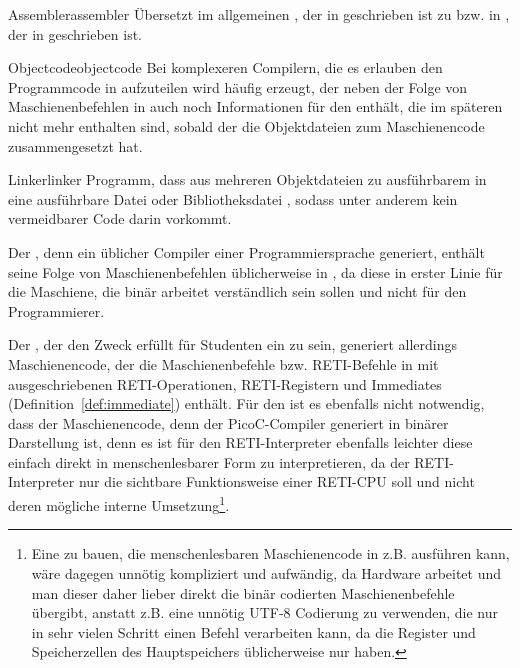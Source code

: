 \begin{Definition}{Assembler}{assembler}
  Übersetzt im allgemeinen , der in  geschrieben ist zu  bzw.  in , der in  geschrieben ist.
\end{Definition}

\begin{Definition}{Objectcode}{objectcode}
  Bei komplexeren Compilern, die es erlauben den Programmcode in  aufzuteilen wird häufig  erzeugt, der neben der Folge von Maschienenbefehlen in  auch noch Informationen für den  enthält, die im späteren  nicht mehr enthalten sind, sobald der  die Objektdateien zum Maschienencode zusammengesetzt hat.
\end{Definition}

\begin{Definition}{Linker}{linker}
  Programm, dass  aus mehreren Objektdateien zu ausführbarem  in eine ausführbare Datei oder Bibliotheksdatei , sodass unter anderem kein vermeidbarer  Code darin vorkommt.
\end{Definition}

Der , denn ein üblicher Compiler einer Programmiersprache generiert, enthält seine Folge von Maschienenbefehlen üblicherweise in , da diese in erster Linie für die Maschiene, die binär arbeitet verständlich sein sollen und nicht für den Programmierer.

Der , der den Zweck erfüllt für Studenten ein  zu sein, generiert allerdings Maschienencode, der die Maschienenbefehle bzw. RETI-Befehle in  mit ausgeschriebenen RETI-Operationen, RETI-Registern und Immediates (Definition~\ref{def:immediate}) enthält. Für den  ist es ebenfalls nicht notwendig, dass der Maschienencode, denn der PicoC-Compiler generiert in binärer Darstellung ist, denn es ist für den RETI-Interpreter ebenfalls leichter diese einfach direkt in menschenlesbarer Form zu interpretieren, da der RETI-Interpreter nur die sichtbare Funktionsweise einer RETI-CPU  soll und nicht deren mögliche interne Umsetzung\footnote{Eine  zu bauen, die menschenlesbaren Maschienencode in z.B.  ausführen kann, wäre dagegen unnötig kompliziert und aufwändig, da Hardware  arbeitet und man dieser daher lieber direkt die binär codierten Maschienenbefehle übergibt, anstatt z.B. eine unnötig  UTF-8 Codierung zu verwenden, die nur in sehr vielen Schritt einen Befehl verarbeiten kann, da die Register und Speicherzellen des Hauptspeichers üblicherweise nur  haben.}.


